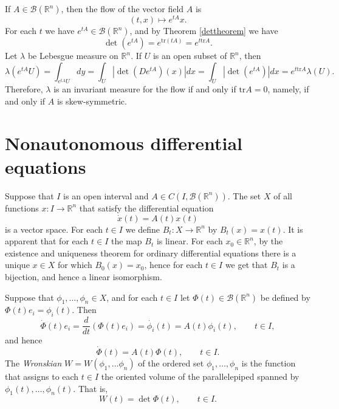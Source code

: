 \documentclass{article}
\newcommand{\tr}{\textrm{tr}}
\theoremstyle{definition}
\begin{document}
If $A \in \mathscr{B}(\mathbb{R}^n)$, then the flow of the vector field $A$ is 
\[
(t,x) \mapsto e^{tA}x.
\]
For each $t$ we have $e^{tA} \in \mathscr{B}(\mathbb{R}^n)$, and by Theorem \ref{dettheorem} we have
\[
\det(e^{tA})= e^{\tr (tA)} = e^{t\tr A}.
\]
Let $\lambda$ be Lebesgue measure on $\mathbb{R}^n$. If $U$ is an open subset of $\mathbb{R}^n$, then
\[
\lambda(e^{tA}U) = \int_{e^{tA}U} dy= \int_U |\det(De^{tA})(x)| dx = \int_U |\det(e^{tA})| dx  = e^{t\tr A} \lambda(U).
\]
Therefore,  $\lambda$ is an invariant measure for the flow if and only if $\tr A=0$, namely, if and only if $A$ is skew-symmetric.


\section{Nonautonomous differential equations}
Suppose that $I$ is an open interval and $A \in C(I, \mathscr{B}(\mathbb{R}^n))$.
The set $X$ of all functions $x:I \to \mathbb{R}^n$ that satisfy   the differential equation
\[
\dot{x}(t)=A(t)x(t)
\]
is a vector space.
For each $t \in I$ we define $B_t:X \to \mathbb{R}^n$ by $B_t(x)=x(t)$. It is apparent that
for each $t \in I$ the map $B_t$ is linear.
For each $x_0 \in \mathbb{R}^n$, by the existence and uniqueness theorem for ordinary differential equations there is a unique $x \in X$ for
which $B_0(x)=x_0$, hence for each $t \in I$ we get that $B_t$ is a bijection, and hence a linear isomorphism.

Suppose that $\phi_1,\ldots,\phi_n \in X$, 
and for each $t \in I$ let $\Phi(t) \in \mathscr{B}(\mathbb{R}^n)$ be defined by $\Phi(t)e_i = \phi_i(t)$. Then
\[
\dot{\Phi}(t)e_i = \frac{d}{dt}(\Phi(t)e_i) = \dot{\phi_i}(t) = A(t)\phi_i(t), \qquad t \in I,
\]
and hence 
\begin{equation}
\dot{\Phi}(t) = A(t) \Phi(t), \qquad t \in I.
\label{Phidot}
\end{equation}
The {\em Wronskian} $W=W(\phi_1,\ldots\phi_n)$ of the ordered set $\phi_1,\ldots,\phi_n$
is the function that assigns to each $t \in I$ the  oriented volume of the parallelepiped spanned by $\phi_1(t),\ldots,\phi_n(t)$. That is,
\[
W(t)=\det \Phi(t), \qquad t \in I.
\]
\end{document}
